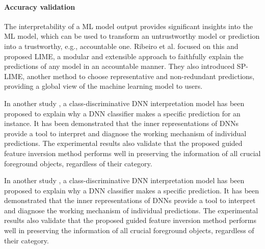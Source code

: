 \paragraph{\textbf{Accuracy validation}}
The interpretability of a ML model output provides significant insights into the ML model, which can be used to transform an untrustworthy model or prediction into a trustworthy, e.g., accountable one. Ribeiro et al. \cite{ribeiro2016should} focused on this and proposed LIME, a modular and extensible approach to faithfully explain the predictions of any model in an accountable manner. They also introduced SP-LIME, another method to choose representative and non-redundant predictions, providing a global view of the machine learning model to users.

In another study \cite{du2018towards}, a class-discriminative DNN interpretation model has been proposed to explain why a DNN classifier makes a specific prediction for an instance. It has been demonstrated that the inner representations of DNNs provide a tool to interpret and diagnose the working mechanism of individual predictions. The experimental results also validate that the proposed guided feature inversion method performs well in preserving the information of all crucial foreground objects, regardless of their category.

In another study \cite{du2018towards}, a class-discriminative DNN interpretation model has been proposed to explain why a DNN classifier makes a specific prediction. It has been demonstrated that the inner representations of DNNs provide a tool to interpret and diagnose the working mechanism of individual predictions. The experimental results also validate that the proposed guided feature inversion method performs well in preserving the information of all crucial foreground objects, regardless of their category.
